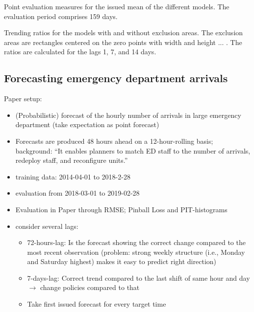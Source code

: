 \begin{table}[]
    \centering
    
    \caption{Point evaluation measures for the issued mean of the different models. The evaluation period comprises 159 days. }
    \label{tab:app-covid-rmse}
\end{table}


\begin{table}
    \centering
    \caption{Trending ratios for the models with and without exclusion areas. The exclusion areas are rectangles centered on the zero points with width and height ... . The ratios are calculated for the lags 1, 7, and 14 days.}
    \label{tab:app-covid-ratios}
\end{table}

\newpage
\subsection{Forecasting emergency department arrivals}\label{sec:application-eda}

\textcite{Rostami-Tabar2023}

Paper setup:

\begin{itemize}
    \item (Probabilistic) forecast of the hourly number of arrivals in large emergency department (take expectation as point forecast)
    \item Forecasts are produced 48 hours ahead on a 12-hour-rolling basis; background: \enquote{It enables planners to match ED staff to the number of arrivals, redeploy staff, and reconfigure units.}
    \item training data: 2014-04-01 to 2018-2-28
    \item evaluation from 2018-03-01 to 2019-02-28
    \item Evaluation in Paper through RMSE; Pinball Loss and PIT-histograms
    \item consider several lags:
    \begin{itemize}
        \item 72-hours-lag: Is the forecast showing the correct change compared to the most recent observation (problem: strong weekly structure (i.e., Monday and Saturday highest) makes it easy to predict right direction)
        \item 7-days-lag: Correct trend compared to the last shift of same hour and day $\rightarrow$ change policies compared to that
        \item Take first issued forecast for every target time
    \end{itemize}
\end{itemize}

